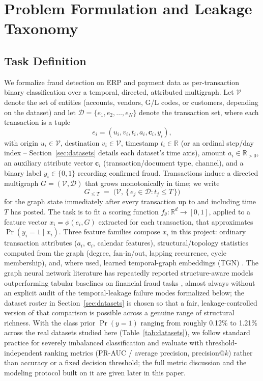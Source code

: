 \section{Problem Formulation and Leakage Taxonomy}\label{sec:problem}

\subsection{Task Definition}

We formalize fraud detection on ERP and payment data as per-transaction
binary classification over a temporal, directed, attributed multigraph. Let
$\mathcal{V}$ denote the set of entities (accounts, vendors, G/L codes, or
customers, depending on the dataset) and let
$\mathcal{D} = \{e_1, e_2, \dots, e_N\}$ denote the transaction set, where
each transaction is a tuple
\[
e_i = (u_i, v_i, t_i, a_i, \mathbf{c}_i, y_i),
\]
with origin $u_i \in \mathcal{V}$, destination $v_i \in \mathcal{V}$,
timestamp $t_i \in \mathbb{R}$ (or an ordinal step/day index --
Section~\ref{sec:datasets} details each dataset's time axis), amount
$a_i \in \mathbb{R}_{>0}$, an auxiliary attribute vector $\mathbf{c}_i$
(transaction/document type, channel), and a binary label
$y_i \in \{0,1\}$ recording confirmed fraud. Transactions induce a directed
multigraph $G = (\mathcal{V}, \mathcal{D})$ that grows monotonically in
time; we write
\[
G_{\le T} \;=\; \bigl(\mathcal{V},\, \{\, e_j \in \mathcal{D} : t_j \le T \,\}\bigr)
\]
for the graph state immediately after every transaction up to and
including time $T$ has posted. The task is to fit a scoring function
$f_\theta : \mathbb{R}^d \to [0,1]$, applied to a feature vector
$x_i = \phi(e_i, G)$ extracted for each transaction, that approximates
$\Pr(y_i = 1 \mid x_i)$. Three feature families compose $x_i$ in this
project: ordinary transaction attributes ($a_i$, $\mathbf{c}_i$, calendar
features), structural/topology statistics computed from the graph (degree,
fan-in/out, lapping recurrence, cycle membership), and, where used, learned
temporal-graph embeddings (TGN) \cite{rossi2020temporal}. The graph
neural network literature has repeatedly reported structure-aware models
outperforming tabular baselines on financial fraud tasks
\cite{motie2024gnn,yuan2025survey}, almost always without an explicit audit
of the temporal-leakage failure modes formalized below; the dataset roster
in Section~\ref{sec:datasets} is chosen so that a fair, leakage-controlled
version of that comparison is possible across a genuine range of
structural richness. With the class prior $\Pr(y=1)$ ranging from roughly
0.12\% to 1.21\% across the real datasets studied here
(Table~\ref{tab:datasets}), we follow standard practice for severely
imbalanced classification \cite{bishop2006pattern} and evaluate with
threshold-independent ranking metrics (PR-AUC / average precision,
precision@$k$) rather than accuracy or a fixed decision threshold; the full
metric discussion and the modeling protocol built on it are given later in
this paper.

